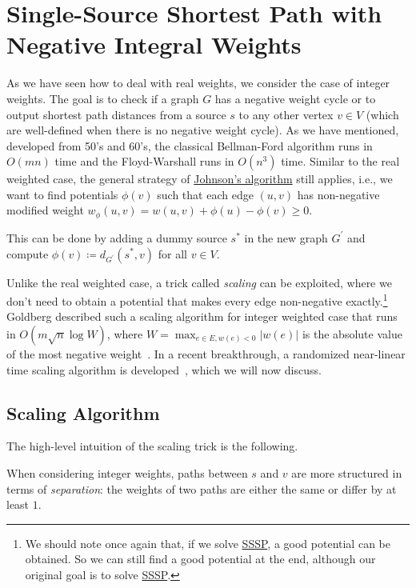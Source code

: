 \section{Single-Source Shortest Path with Negative Integral Weights}
As we have seen how to deal with real weights, we consider the case of integer weights. The goal is to check if a graph \(G\) has a negative weight cycle or to output shortest path distances from a source \(s\) to any other vertex \(v \in V\) (which are well-defined when there is no negative weight cycle). As we have mentioned, developed from 50's and 60's, the classical Bellman-Ford algorithm runs in \(O(mn)\) time and the Floyd-Warshall runs in \(O(n^3)\) time. Similar to the real weighted case, the general strategy of \hyperref[prev:Johnson-algorithm]{Johnson's algorithm} still applies, i.e., we want to find potentials \(\phi (v)\) such that each edge \((u, v)\) has non-negative modified weight \(w_{\phi }(u, v) = w(u, v) + \phi (u) - \phi (v) \geq 0\).

\begin{prev}
	This can be done by adding a dummy source \(s^{\ast} \) in the new graph \(G^{\prime} \) and compute \(\phi (v) \coloneqq d_{G^{\prime} }(s^{\ast} , v)\) for all \(v \in V\).
\end{prev}

Unlike the real weighted case, a trick called \emph{scaling} can be exploited, where we don't need to obtain a potential that makes every edge non-negative exactly.\footnote{We should note once again that, if we solve \hyperref[prb:SSSP]{SSSP}, a good potential can be obtained. So we can still find a good potential at the end, although our original goal is to solve \hyperref[prb:SSSP]{SSSP}.} Goldberg described such a scaling algorithm for integer weighted case that runs in \(O(m \sqrt{n} \log W)\), where \(W = \max _{e \in E, w(e) < 0} \lvert w(e) \rvert \) is the absolute value of the most negative weight~\cite{goldberg1995scaling}. In a recent breakthrough, a randomized near-linear time scaling algorithm is developed~\cite{bernstein2022negative,bringmann2023negative}, which we will now discuss.

\subsection{Scaling Algorithm}
The high-level intuition of the scaling trick is the following.

\begin{intuition}[Scaling]
	When considering integer weights, paths between \(s\) and \(v\) are more structured in terms of \emph{separation}: the weights of two paths are either the same or differ by at least \(1\).
\end{intuition}

